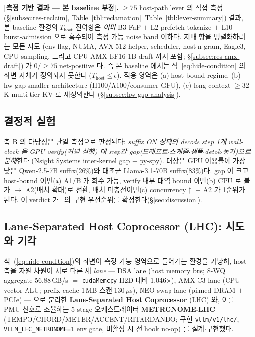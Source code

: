 \smallskip
\noindent\textbf{[측정 기반 결과 — 본 baseline 부정].}
$\ge\!75$ host-path lever 의 직접 측정 (\S\ref{subsec:res-reclaim}, Table~\ref{tbl:reclamation},
Table~\ref{tbl:lever-summary}) 결과,
본 baseline 환경의 $T_{\mathrm{host}}$ 잔여항은 \emph{이미} B3-FaP $+$ L2-prefetch-tokenize $+$ L10-burst-admission
으로 흡수되어 측정 가능 noise band 이하다.
지배 항을 병렬화하려는 모든 시도 (env-flag, NUMA, AVX-512 helper, scheduler, host n-gram, Eagle3,
CPU sampling, 그리고 CPU AMX BF16 1B draft 까지 포함; \S\ref{subsec:res-amx-draft}) 가
0/$\ge75$ net-positive 다.
즉 본 baseline 에서는 식~\ref{eq:hide-condition} 의 좌변 자체가 정의되지 못한다
($T_{\mathrm{host}}\!\le\!\epsilon$).
적용 영역은 (a) host-bound regime, (b) hw-gap-smaller architecture (H100/A100/consumer GPU),
(c) long-context $\ge\!32$K multi-tier KV 로 재정의한다 (\S\ref{subsec:hw-gap-analysis}).

\subsection{결정적 실험}
\label{subsec:decisive}

축 B 의 타당성은 단일 측정으로 판정된다:
\emph{suffix ON 상태의 decode step 1개 wall-clock 을 GPU verify(커널 실행) 대
step간 gap(드래프트$\cdot$스케줄$\cdot$샘플$\cdot$detok$\cdot$동기)으로 분해}한다
(Nsight Systems inter-kernel gap + py-spy).
대상은 GPU 이용률이 가장 낮은 Qwen-2.5-7B suffix(26\%)와 대조군 Llama-3.1-70B suffix(83\%)다.
gap 이 크고 host-bound 이면(a) A1/B 가 회수 가능,
verify 내부 대역 bound 이면(b) CPU 로 불가 $\to$ A2(배치 확대)로 전환,
배치 미충전이면(c) concurrency$\uparrow$ + A2 가 1순위가 된다.
이 verdict 가 \algname\ 의 구현 우선순위를 확정한다(\S\ref{sec:discussion}).

\subsection{Lane-Separated Host Coprocessor (LHC): 시도와 기각}
\label{subsec:lhc-def}

식~(\ref{eq:hide-condition})의 좌변이 측정 가능 영역으로 들어가는 환경을
겨냥해, host 측을 자원 차원이 서로 다른 세 \emph{lane} --- DSA lane
(host memory bus; 8-WQ aggregate 56.88\,GB/s $=$ \texttt{cudaMemcpy} H2D
대비 1.046$\times$), AMX C3 lane (CPU vector ALU; prefix-cache 1\,MB
스캔 130\,$\mu$s), NEO swap lane (pinned DRAM $+$ PCIe) --- 으로 분리한
\textbf{Lane-Separated Host Coprocessor} (LHC) 와, 이를 PMU 신호로
조율하는 5-stage 오케스트레이터 \textbf{METRONOME-LHC}
(TEMPO/CHORD/METER/ACCENT/RITARDANDO; 구현 \texttt{vllm/v1/lhc/},
\texttt{VLLM\_LHC\_METRONOME=1} env gate, 비활성 시 전 hook no-op) 를
설계$\cdot$구현했다.

